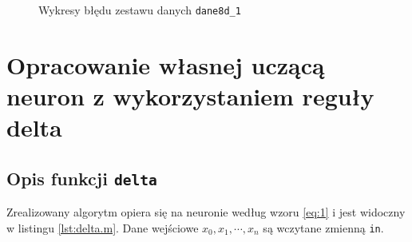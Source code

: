 \documentclass[pointlessnumbers, abstracton, headsepline, a4paper]{scrartcl}
\begin{document}
\begin{figure}[!h]
\centering
{}
\caption{\label{fig:dane8d_1_error}Wykresy błędu zestawu danych \texttt{dane8d\_1}}
\end{figure}

\clearpage
\section{Opracowanie własnej uczącą neuron z wykorzystaniem reguły delta}
\subsection{Opis funkcji \texttt{delta}}
Zrealizowany algorytm opiera się na neuronie według wzoru \ref{eq:1} i jest widoczny w listingu \ref{lst:delta.m}. Dane wejściowe $x_0, x_1, \cdots, x_n$ są wczytane zmienną \texttt{in}.
\end{document}

